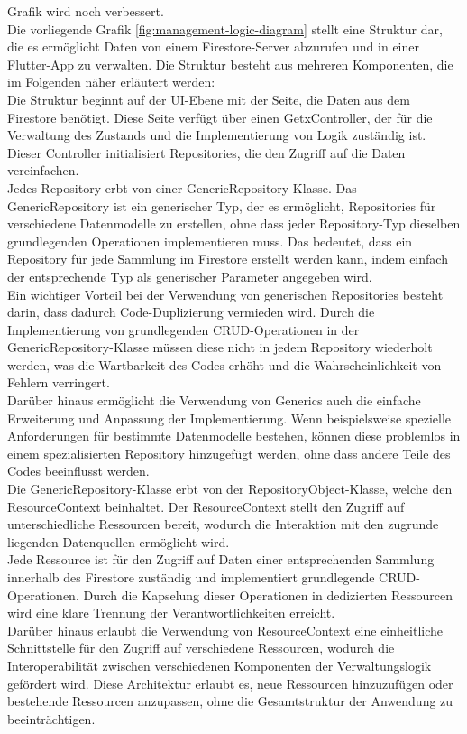 Grafik wird noch verbessert.
\\
Die vorliegende Grafik \ref{fig:management-logic-diagram} stellt eine Struktur dar, die es ermöglicht Daten von einem Firestore-Server abzurufen und in einer Flutter-App zu verwalten. Die Struktur besteht aus mehreren Komponenten, die im Folgenden näher erläutert werden:
\\
Die Struktur beginnt auf der UI-Ebene mit der Seite, die Daten aus dem Firestore benötigt. Diese Seite verfügt über einen GetxController, der für die Verwaltung des Zustands und die Implementierung von Logik zuständig ist. Dieser Controller initialisiert Repositories, die den Zugriff auf die Daten vereinfachen.
\\
Jedes Repository erbt von einer GenericRepository-Klasse. Das GenericRepository ist ein generischer Typ, der es ermöglicht, Repositories für verschiedene Datenmodelle zu erstellen, ohne dass jeder Repository-Typ dieselben grundlegenden Operationen implementieren muss. Das bedeutet, dass ein Repository für jede Sammlung im Firestore erstellt werden kann, indem einfach der entsprechende Typ als generischer Parameter angegeben wird.
\\
Ein wichtiger Vorteil bei der Verwendung von generischen Repositories besteht darin, dass dadurch Code-Duplizierung vermieden wird. Durch die Implementierung von grundlegenden CRUD-Operationen in der GenericRepository-Klasse müssen diese nicht in jedem Repository wiederholt werden, was die Wartbarkeit des Codes erhöht und die Wahrscheinlichkeit von Fehlern verringert.
\\
Darüber hinaus ermöglicht die Verwendung von Generics auch die einfache Erweiterung und Anpassung der Implementierung. Wenn beispielsweise spezielle Anforderungen für bestimmte Datenmodelle bestehen, können diese problemlos in einem spezialisierten Repository hinzugefügt werden, ohne dass andere Teile des Codes beeinflusst werden.
\\
Die GenericRepository-Klasse erbt von der RepositoryObject-Klasse, welche den ResourceContext beinhaltet. Der ResourceContext stellt den Zugriff auf unterschiedliche Ressourcen bereit, wodurch die Interaktion mit den zugrunde liegenden Datenquellen ermöglicht wird.
\\
Jede Ressource ist für den Zugriff auf Daten einer entsprechenden Sammlung innerhalb des Firestore zuständig und implementiert grundlegende CRUD-Operationen. Durch die Kapselung dieser Operationen in dedizierten Ressourcen wird eine klare Trennung der Verantwortlichkeiten erreicht.
\\
Darüber hinaus erlaubt die Verwendung von ResourceContext eine einheitliche Schnittstelle für den Zugriff auf verschiedene Ressourcen, wodurch die Interoperabilität zwischen verschiedenen Komponenten der Verwaltungslogik gefördert wird. Diese Architektur erlaubt es, neue Ressourcen hinzuzufügen oder bestehende Ressourcen anzupassen, ohne die Gesamtstruktur der Anwendung zu beeinträchtigen.


